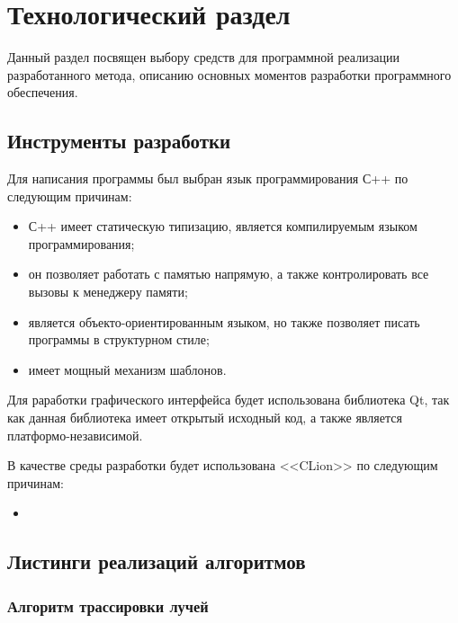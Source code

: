 \chapter{Технологический раздел}

Данный раздел посвящен выбору средств для программной реализации разработанного метода, описанию основных моментов разработки программного обеспечения.

\section{Инструменты разработки}

Для написания программы был выбран язык программирования С++\cite{c++} по следующим причинам:

\begin{itemize}
	\item С++ имеет статическую типизацию, является компилируемым языком программирования;
	\item он позволяет работать с памятью напрямую, а также контролировать все вызовы к менеджеру памяти;
	\item является объекто-ориентированным языком, но также позволяет писать программы в структурном стиле;
	\item имеет мощный механизм шаблонов.
\end{itemize}

Для раработки графического интерфейса будет использована библиотека Qt, так как данная библиотека имеет открытый исходный код, а также является платформо-независимой.

В качестве среды разработки будет использована <<CLion>>\cite{clion} по следующим причинам:

\begin{itemize}
	\item 
\end{itemize}

\section{Листинги реализаций алгоритмов}

\subsection{Алгоритм трассировки лучей}

